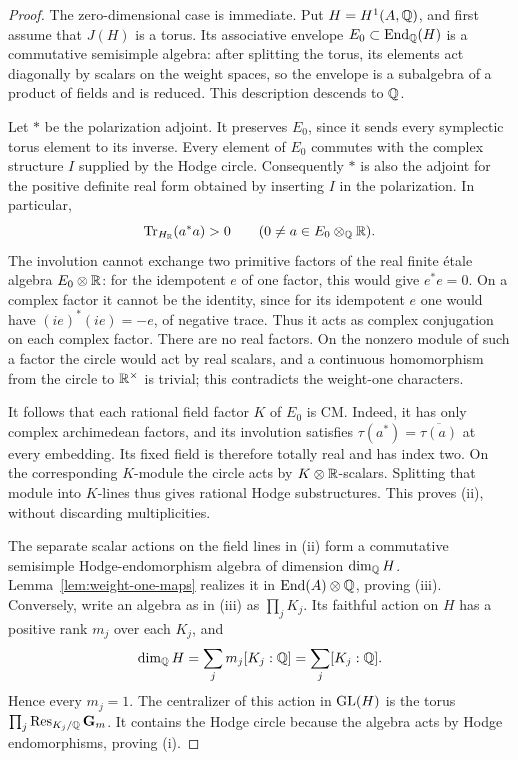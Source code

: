 \begin{proof}
The zero-dimensional case is immediate.  Put \(H=H^1(A,\mathbb{Q})\), and
first assume that \(J(H)\) is a torus.  Its associative envelope
\(E_0\subset\operatorname{End}_{\mathbb{Q}}(H)\) is a commutative semisimple algebra: after
splitting the torus, its elements act diagonally by scalars on the
weight spaces, so the envelope is a subalgebra of a product of fields
and is reduced.  This description descends to \(\mathbb{Q}\).

Let \(*\) be the polarization adjoint.  It preserves \(E_0\), since
it sends every symplectic torus element to its inverse.  Every element
of \(E_0\) commutes with the complex structure \(I\) supplied by the
Hodge circle.  Consequently \(*\) is also the adjoint for the positive
definite real form obtained by inserting \(I\) in the polarization.
In particular,
\[
 \operatorname{Tr}_{H_{\mathbb{R}}}(a^*a)>0\qquad(0\ne a\in E_0\otimes_{\mathbb{Q}}\mathbb{R}).
\]
The involution cannot exchange two primitive factors of the real
finite étale algebra \(E_0\otimes\mathbb{R}\): for the idempotent \(e\) of one
factor, this would give \(e^*e=0\).  On a complex factor it cannot be
the identity, since for its idempotent \(e\) one would have
\((ie)^*(ie)=-e\), of negative trace.  Thus it acts as complex
conjugation on each complex factor.  There are no real factors.  On
the nonzero module of such a factor the circle would act by real
scalars, and a continuous homomorphism from the circle to
\(\mathbb{R}^\times\) is trivial; this contradicts the weight-one characters.

It follows that each rational field factor \(K\) of \(E_0\) is CM.
Indeed, it has only complex archimedean factors, and its involution
satisfies \(\tau(a^*)=\overline{\tau(a)}\) at every embedding.  Its
fixed field is therefore totally real and has index two.  On the
corresponding \(K\)-module the circle acts by \(K\otimes\mathbb{R}\)-scalars.
Splitting that module into \(K\)-lines thus gives rational Hodge
substructures.  This proves (ii), without discarding multiplicities.

The separate scalar actions on the field lines in (ii) form a
commutative semisimple Hodge-endomorphism algebra of dimension
\(\dim_{\mathbb{Q}}H\).  Lemma~\ref{lem:weight-one-maps} realizes it in
\(\operatorname{End}(A)\otimes\mathbb{Q}\), proving (iii).  Conversely, write an algebra as
in (iii) as \(\prod_jK_j\).  Its faithful action on \(H\) has a
positive rank \(m_j\) over each \(K_j\), and
\[
 \dim_{\mathbb{Q}}H=\sum_jm_j[K_j:\mathbb{Q}]=\sum_j[K_j:\mathbb{Q}].
\]
Hence every \(m_j=1\).  The centralizer of this action in \(\operatorname{GL}(H)\)
is the torus \(\prod_j\operatorname{Res}_{K_j/\mathbb{Q}}\mathbf G_m\).  It contains the
Hodge circle because the algebra acts by Hodge endomorphisms, proving
(i).
\end{proof}

